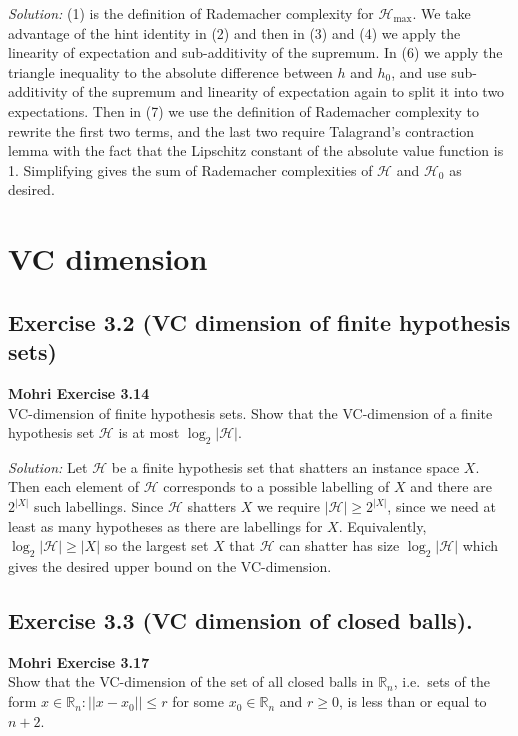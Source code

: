 \documentclass[
	10pt, %
	a4paper, %
	oneside, %
	headinclude,footinclude, %
	BCOR5mm, %
]{scrartcl}
\newenvironment{problem}[2][]
{ \begin{mdframed}[backgroundcolor=gray!20] \textbf{#1 #2} \\}
		{  \end{mdframed}}
\newenvironment{solution}
{\textit{Solution:}}
{}
\begin{document}
\begin{solution}
	(1) is the definition of Rademacher complexity for $\mathcal{H}_{\max}$. We take advantage of the hint identity in (2) and then in (3) and (4) we apply the linearity of expectation and sub-additivity of the supremum. In (6) we apply the triangle inequality to the absolute difference between $h$ and $h_0$, and use sub-additivity of the supremum and linearity of expectation again to split it into two expectations. Then in (7) we use the definition of Rademacher complexity to rewrite the first two terms, and the last two require Talagrand's contraction lemma with the fact that the Lipschitz constant of the absolute value function is 1. Simplifying gives the sum of Rademacher complexities of $\mathcal{H}$ and $\mathcal{H}_0$ as desired.

\end{solution}

\section{VC dimension}

\subsection*{Exercise 3.2 (VC dimension of finite hypothesis sets)}
\begin{problem}{Mohri Exercise 3.14}
VC-dimension of finite hypothesis sets. Show that the VC-dimension of a finite hypothesis set $\mathcal{H}$ is at most $\log_2|\mathcal{H}|$.
\end{problem}

\begin{solution}
	Let $\mathcal{H}$ be a finite hypothesis set that shatters an instance space $X$. Then each element of $\mathcal{H}$ corresponds to a possible labelling of $X$ and there are $2^{|X|}$ such labellings. Since $\mathcal{H}$ shatters $X$ we require $|\mathcal{H}| \geq 2^{|X|}$, since we need at least as many hypotheses as there are labellings for $X$. Equivalently, $\log_2{|\mathcal{H}|} \geq |X|$ so the largest set $X$ that $\mathcal{H}$ can shatter has size $\log_2 |\mathcal{H}|$ which gives the desired upper bound on the VC-dimension.
\end{solution}

\subsection*{Exercise 3.3 (VC dimension of closed balls).}
\begin{problem}{Mohri Exercise 3.17}
Show that the VC-dimension of the set of all closed balls in $\mathbb{R}_n$, i.e.\ sets of the form ${x \in \mathbb{R}_n : ||x-x_0|| \leq r}$ for some $x_0 \in \mathbb{R}_n$ and $r \geq 0$, is less than or equal to $n + 2$.
\end{problem}
\end{document}
